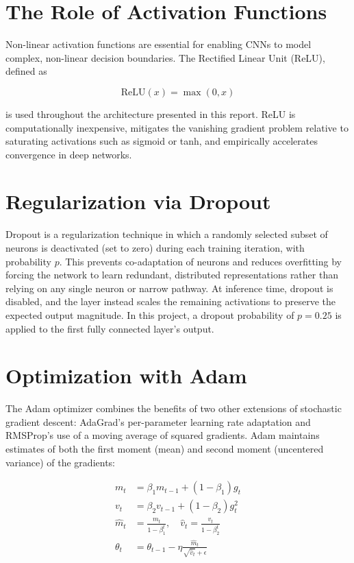 \documentclass[12pt,a4paper]{report}
\begin{document}
\section{The Role of Activation Functions}
Non-linear activation functions are essential for enabling CNNs to model complex, non-linear decision boundaries. The Rectified Linear Unit (ReLU), defined as

\begin{equation}
    \text{ReLU}(x) = \max(0, x)
\end{equation}

is used throughout the architecture presented in this report. ReLU is computationally inexpensive, mitigates the vanishing gradient problem relative to saturating activations such as sigmoid or tanh, and empirically accelerates convergence in deep networks.

\section{Regularization via Dropout}
Dropout \cite{srivastava2014dropout} is a regularization technique in which a randomly selected subset of neurons is deactivated (set to zero) during each training iteration, with probability $p$. This prevents co-adaptation of neurons and reduces overfitting by forcing the network to learn redundant, distributed representations rather than relying on any single neuron or narrow pathway. At inference time, dropout is disabled, and the layer instead scales the remaining activations to preserve the expected output magnitude. In this project, a dropout probability of $p = 0.25$ is applied to the first fully connected layer's output.

\section{Optimization with Adam}
The Adam optimizer \cite{kingma2014adam} combines the benefits of two other extensions of stochastic gradient descent: AdaGrad's per-parameter learning rate adaptation and RMSProp's use of a moving average of squared gradients. Adam maintains estimates of both the first moment (mean) and second moment (uncentered variance) of the gradients:

\begin{align}
    m_t &= \beta_1 m_{t-1} + (1-\beta_1) g_t \\
    v_t &= \beta_2 v_{t-1} + (1-\beta_2) g_t^2 \\
    \hat{m}_t &= \frac{m_t}{1-\beta_1^t}, \quad \hat{v}_t = \frac{v_t}{1-\beta_2^t} \\
    \theta_t &= \theta_{t-1} - \eta \frac{\hat{m}_t}{\sqrt{\hat{v}_t} + \epsilon}
\end{align}
\end{document}
